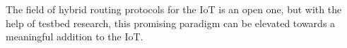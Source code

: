 \documentclass[a4paper,10pt]{scrartcl}
\begin{document}
The field of hybrid routing protocols for the IoT is an open one, but with the help of testbed research, this promising paradigm can be elevated towards a meaningful addition to the IoT.



\newpage

\printglossaries

{\small


}
\end{document}
